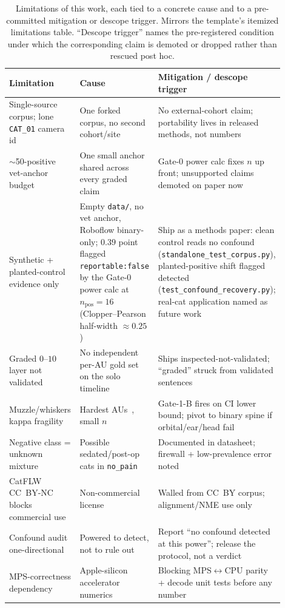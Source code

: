 \begin{table}[t]
  \centering
  \caption[Limitations, causes, and mitigations]{Limitations of this work, each
  tied to a concrete cause and to a pre-committed mitigation or descope trigger.
  Mirrors the template's itemized limitations table. ``Descope trigger'' names
  the pre-registered condition under which the corresponding claim is demoted or
  dropped rather than rescued post hoc.}
  \label{tab:limitations}
  \small
  \begin{tabular}{@{}p{0.27\linewidth} p{0.30\linewidth} p{0.33\linewidth}@{}}
    \toprule
    \textbf{Limitation} & \textbf{Cause} & \textbf{Mitigation / descope trigger} \\
    \midrule
    Single-source corpus; lone \texttt{CAT\_01} camera id &
    One forked corpus, no second cohort/site &
    No external-cohort claim; portability lives in released methods, not numbers \\
    \addlinespace
    $\sim$50-positive vet-anchor budget &
    One small anchor shared across every graded claim &
    Gate-0 power calc fixes $n$ up front; unsupported claims demoted on paper now \\
    \addlinespace
    Synthetic + planted-control evidence only &
    Empty \texttt{data/}, no vet anchor, Roboflow binary-only; $0.39$ point
    flagged \texttt{reportable:false} by the Gate-0 power calc at
    $n_{\text{pos}}{=}16$ (Clopper--Pearson half-width $\approx 0.25$) &
    Ship as a methods paper: clean control reads no confound
    (\texttt{standalone\_test\_corpus.py}), planted-positive shift flagged
    detected (\texttt{test\_confound\_recovery.py}); real-cat application named as
    future work \\
    \addlinespace
    Graded $0$--$10$ layer not validated &
    No independent per-AU gold set on the solo timeline &
    Ships inspected-not-validated; ``graded'' struck from validated sentences \\
    \addlinespace
    Muzzle/whiskers kappa fragility &
    Hardest AUs~\cite{feighelstein2023}, small $n$ &
    Gate-1-B fires on CI lower bound; pivot to binary spine if orbital/ear/head fail \\
    \addlinespace
    Negative class = unknown mixture &
    Possible sedated/post-op cats in \texttt{no\_pain} &
    Documented in datasheet; firewall + low-prevalence error noted~\cite{chavoshi2025} \\
    \addlinespace
    CatFLW CC~BY-NC blocks commercial use &
    Non-commercial license~\cite{martvel2024catflw} &
    Walled from CC~BY corpus; alignment/NME use only \\
    \addlinespace
    Confound audit one-directional &
    Powered to detect, not to rule out &
    Report ``no confound detected at this power''; release the protocol, not a verdict \\
    \addlinespace
    MPS-correctness dependency &
    Apple-silicon accelerator numerics &
    Blocking MPS$\leftrightarrow$CPU parity + decode unit tests before any number \\
    \bottomrule
  \end{tabular}
\end{table}

